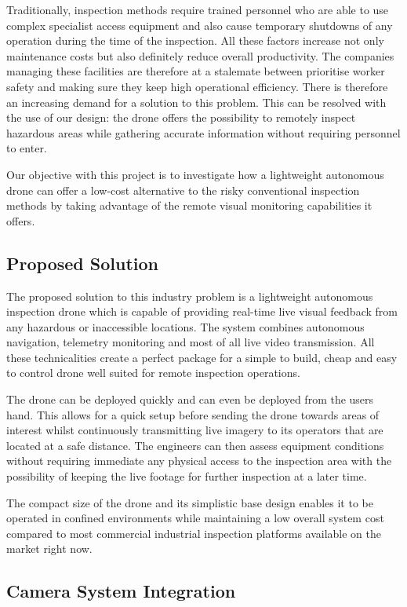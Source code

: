 \documentclass[conference]{IEEEtran}
\begin{document}
Traditionally, inspection methods require trained personnel who are able to use complex specialist access equipment and also cause temporary shutdowns of any operation during the time of the inspection. All these factors increase not only maintenance costs but also definitely reduce overall productivity. The companies managing these facilities are therefore at a stalemate between prioritise worker safety and making sure they keep high operational efficiency. There is therefore an increasing demand for a solution to this problem. This can be resolved with the use of our design: the drone  offers the possibility to remotely inspect hazardous areas while gathering accurate information without requiring personnel to enter.

Our objective with this project is to investigate how a lightweight autonomous drone can offer a low-cost alternative to the risky conventional inspection methods by taking advantage of the remote visual monitoring capabilities it offers.

\subsection*{Proposed Solution}

The proposed solution to this industry problem is a lightweight autonomous inspection drone which is capable of providing real-time live visual feedback from any hazardous or inaccessible locations. The system combines autonomous navigation, telemetry monitoring and most of all live video transmission. All these technicalities create a perfect package for a simple to build, cheap and easy to control drone well suited for remote inspection operations.

The drone can be deployed quickly and can even be deployed from the users hand. This allows for a quick setup before sending the drone towards areas of interest whilst continuously transmitting live imagery to its operators that are located at a safe distance. The engineers can then assess equipment conditions without requiring immediate any physical access to the inspection area with the possibility of keeping the live footage for further inspection at a later time.

The compact size of the drone and its simplistic base design enables it to be operated in confined environments while maintaining a low overall system cost compared to most commercial industrial inspection platforms available on the market right now.

\subsection*{Camera System Integration}
\end{document}
